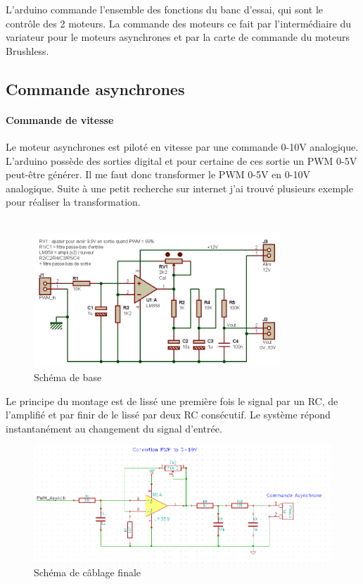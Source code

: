 \documentclass[11pt]{article}
\begin{document}
L'arduino commande l'ensemble des fonctions du banc d'essai, qui sont le contrôle des 2 moteurs. La commande des moteurs ce fait par l'intermédiaire du variateur pour le moteurs asynchrones et par la carte de commande du moteurs Brushless. 

\subsection{Commande asynchrones}

\paragraph{Commande de vitesse \\}
Le moteur asynchrones est piloté en vitesse par une commande 0-10V analogique. L'arduino possède des sorties digital et pour certaine de ces sortie un PWM 0-5V peut-être générer. Il me faut donc transformer le PWM 0-5V en 0-10V analogique. Suite à une petit recherche sur internet j'ai trouvé plusieurs exemple pour réaliser la transformation.\\
\\
\begin{figure}[!h]
    \centering
    \includegraphics[width=350px]{electronique_conv_pwm_tension.jpg}
    \caption{Schéma de base}
\end{figure}

Le principe du montage est de lissé une première fois le signal par un RC, de l'amplifié et par finir de le lissé par deux RC consécutif. Le système répond instantanément au changement du signal d'entrée.


\begin{figure}[!h]
    \centering
    \includegraphics[width=500px]{schema_digt_anolog.png}
    \caption{Schéma de câblage finale}
\end{figure}
\end{document}
